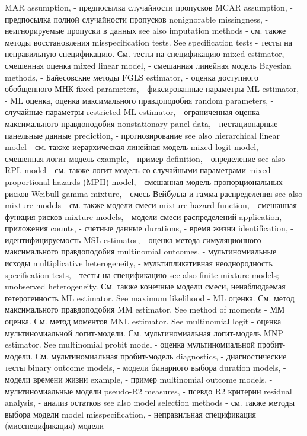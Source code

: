 MAR assumption, - предпосылка случайности пропусков
MCAR assumption, - предпосылка полной случайности пропусков
nonignorable missingness, - неигнорируемые пропуски в данных
see also imputation methods - см. также методы восстановления
misspecification tests. See specification tests - тесты на неправильную спецификацию. См. тесты на спецификацию
mixed estimator, - смешенная оценка
mixed linear model, - смешанная линейная модель
Bayesian methods, - Байесовские методы
FGLS estimator, - оценка доступного обобщенного МНК
fixed parameters, - фиксированные параметры
ML estimator, - ML оценка, оценка максимального правдоподобия
random parameters, - случайные параметры
restricted ML estimator, - ограниченная оценка максимального правдоподобия
nonstationary panel data, - нестационарные панельные данные
prediction, - прогнозирование
see also hierarchical linear model  - см. также иерархическая линейная модель
mixed logit model, - смешенная логит-модель
example, - пример
definition, - определение
see also RPL model - см. также логит-модель со случайными параметрами
mixed proportional hazards (MPH) model, - смешанная модель пропорциональных рисков
Weibull-gamma mixture, - смесь Вейбулла и гамма-распределения
see also mixture models - см. также модели смеси
mixture hazard function, - смешанная функция рисков
mixture models, - модели смеси распределений
application, - приложения
counts, - счетные данные
durations, - время жизни
identification, - идентифицируемость
MSL estimator, - оценка метода симуляционного максимального правдоподобия
multinomial outcomes, - мультиномиальные исходы
multiplicative heterogeneity, - мультипликативная неоднородность
specification tests, - тесты на спецификацию
see also finite mixture models; unobserved heterogeneity. См. также конечные модели смеси, ненаблюдаемая гетерогенность
ML estimator. See maximum likelihood - ML оценка. См. метод максимального правдоподобия
MM estimator. See method of moments - ММ оценка. См. метод моментов
MNL estimator. See multinomial logit - оценка мультиномиальной логит-модели. См. мультиномиальная логит-модель
MNP estimator. See multinomial probit model - оценка мультиномиальной пробит-модели. См. мультиномиальная пробит-модель
diagnostics, - диагностические тесты
binary outcome models, - модели бинарного выбора
duration models, - модели времени жизни
example, - пример
multinomial outcome models, - мультиномиальные модели
pseudo-R2 measures, - псевдо R2 критерии
residual analysis, - анализ остатков
see also model selection methods - см. также методы выбора модели
model misspecification, - неправильная спецификация (мисспецификация) модели
